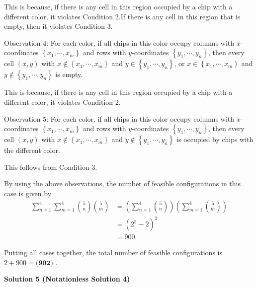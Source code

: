 \begin{enumerate}
 This is because, if there is any cell in this region occupied by a chip with a different color, it violates Condition 2.If there is any cell in this region that is empty, then it violates Condition 3.

 Observation 4: For each color, if all chips in this color occupy columns with $x$-coordinates $\left\{ x_1, \cdots, x_m \right\}$ and rows with $y$-coordinates $\left\{ y_1, \cdots, y_n \right\}$, then every cell $\left( x, y \right)$ with $x \notin \left\{ x_1, \cdots , x_m \right\}$ and $y \in \left\{ y_1, \cdots , y_n \right\}$, or $x \in \left\{ x_1, \cdots , x_m \right\}$ and $y \notin \left\{ y_1, \cdots , y_n \right\}$ is empty.

 This is because, if there is any cell in this region occupied by a chip with a different color, it violates Condition 2.

 Observation 5: For each color, if all chips in this color occupy columns with $x$-coordinates $\left\{ x_1, \cdots, x_m \right\}$ and rows with $y$-coordinates $\left\{ y_1, \cdots, y_n \right\}$, then every cell $\left( x, y \right)$ with $x \notin \left\{ x_1, \cdots , x_m \right\}$ and $y \notin \left\{ y_1, \cdots , y_n \right\}$ is occupied by chips with the different color.

 This follows from Condition 3.

 By using the above observations, the number of feasible configurations in this case is given by\begin{align*}\sum_{n=1}^4 \sum_{m=1}^4 \binom{5}{n} \binom{5}{m}& = \left( \sum_{n=1}^4 \binom{5}{n} \right)\left( \sum_{m=1}^4 \binom{5}{m} \right) \\& = \left( 2^5 - 2 \right)^2 \\& = 900 .\end{align*}


 Putting all cases together, the total number of feasible configurations is $2 + 900 =  \boxed{\textbf{(902) }}$.

 



\textbf{Solution 5 (Notationless Solution 4)}


\end{enumerate}
